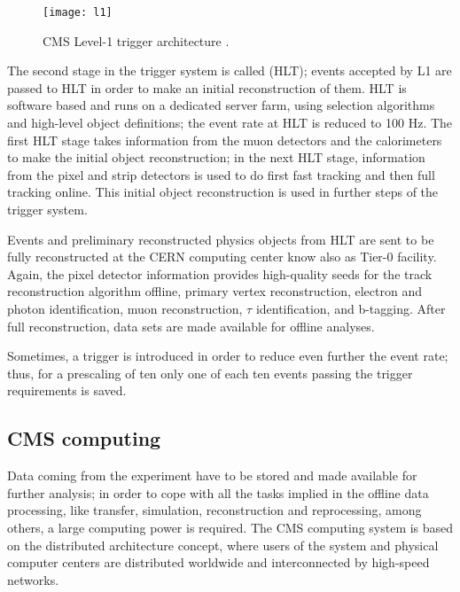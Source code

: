 \begin{figure}[h!]
  \centering
  \texttt{[image: l1]}
  \caption[CMS Level-1 trigger architecture]{CMS Level-1 trigger architecture \cite{l1}. }
  \label{fig:l1}
\end{figure}

The second stage in the trigger system is called  (HLT); events accepted by L1 are passed to HLT in order to make an initial reconstruction of them. HLT is software based and runs on a dedicated server farm, using selection algorithms and high-level object definitions; the event rate at HLT is reduced to 100 Hz. The first HLT stage takes information from the muon detectors and the calorimeters to make the initial object reconstruction; in the next HLT stage, information from the pixel and strip detectors is used to do first fast tracking and then full tracking online. This initial object reconstruction is used in further steps of the trigger system.

Events and preliminary reconstructed physics objects from HLT are sent to be fully reconstructed at the CERN computing center know also as Tier-0 facility. Again, the pixel detector information provides high-quality seeds for the track reconstruction algorithm offline, primary vertex reconstruction, electron and photon identification, muon reconstruction, $\tau$ identification, and b-tagging. After full reconstruction, data sets are made available for offline analyses.

Sometimes, a trigger  is introduced in order to reduce even further the event rate; thus, for a prescaling of ten only one of each ten events passing the trigger requirements is saved.    

\subsection{CMS computing}

Data coming from the experiment have to be stored and made available for further analysis; in order to cope with all the tasks implied in the offline data processing, like transfer, simulation, reconstruction and reprocessing, among others, a large computing power is required. The CMS computing system is based on the distributed architecture concept, where users of the system and physical computer centers are distributed worldwide and interconnected by high-speed networks.

